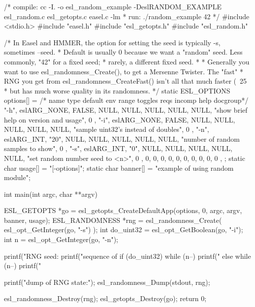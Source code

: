 \begin{cchunk}
/* compile: cc -I. -o esl_random_example -DeslRANDOM_EXAMPLE esl_random.c esl_getopts.c easel.c -lm
 * run:     ./random_example 42
 */
#include <stdio.h>
#include "easel.h"
#include "esl_getopts.h"
#include "esl_random.h"

/* In Easel and HMMER, the option for setting the seed is typically -s, sometimes --seed.
 * Default is usually 0 because we want a "random" seed. Less commonly, "42" for a fixed seed;
 * rarely, a different fixed seed.  
 * 
 * Generally you want to use esl_randomness_Create(), to get a Mersenne Twister. The "fast"
 * RNG you get from esl_randomness_CreateFast() isn't all that much faster (~25%
 * but has much worse quality in its randomness.
 */
static ESL_OPTIONS options[] = {
  /* name           type      default  env  range toggles reqs incomp  help                                       docgroup*/
  { "-h",        eslARG_NONE,   FALSE,  NULL, NULL,  NULL,  NULL, NULL, "show brief help on version and usage",  0 },
  { "-i",        eslARG_NONE,   FALSE,  NULL, NULL,  NULL,  NULL, NULL, "sample uint32's instead of doubles",    0 },
  { "-n",        eslARG_INT,     "20",  NULL, NULL,  NULL,  NULL, NULL, "number of random samples to show",      0 },
  { "-s",        eslARG_INT,      "0",  NULL, NULL,  NULL,  NULL, NULL, "set random number seed to <n>",         0 },
  {  0, 0, 0, 0, 0, 0, 0, 0, 0, 0 },
};
static char usage[]  = "[-options]";
static char banner[] = "example of using random module";

int 
main(int argc, char **argv)
{
  ESL_GETOPTS    *go        = esl_getopts_CreateDefaultApp(options, 0, argc, argv, banner, usage);
  ESL_RANDOMNESS *rng       = esl_randomness_Create( esl_opt_GetInteger(go, "-s") );   
  int             do_uint32 = esl_opt_GetBoolean(go, "-i");
  int             n         = esl_opt_GetInteger(go, "-n");

  printf("RNG seed: %
  printf("\nA sequence of %
  if (do_uint32)  while (n--)  printf("%
  else            while (n--)  printf("%
  
  printf("\nInternal dump of RNG state:\n");
  esl_randomness_Dump(stdout, rng);

  esl_randomness_Destroy(rng);
  esl_getopts_Destroy(go);
  return 0;
}
\end{cchunk}
